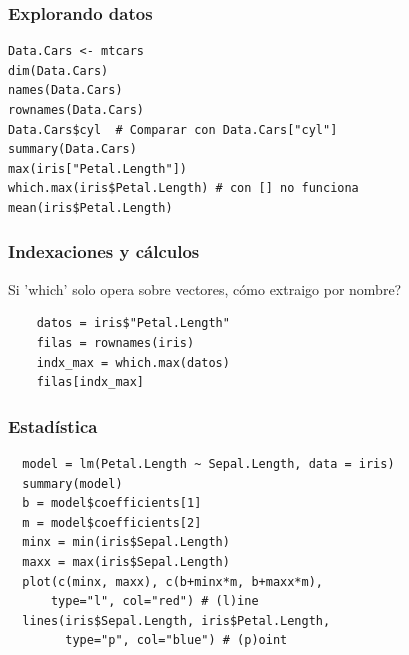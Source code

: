 \documentclass[14pt,aspectratio=169,xcolor=dvipsnames]{beamer}
\begin{document}
\begin{frame}[fragile]\frametitle{Explorando datos}
    \begin{verbatim}
Data.Cars <- mtcars 
dim(Data.Cars)
names(Data.Cars) 
rownames(Data.Cars)
Data.Cars$cyl  # Comparar con Data.Cars["cyl"]
summary(Data.Cars)
max(iris["Petal.Length"]) 
which.max(iris$Petal.Length) # con [] no funciona
mean(iris$Petal.Length)
    \end{verbatim}
\end{frame}
\begin{frame}[fragile]\frametitle{Indexaciones y cálculos}
Si 'which' solo opera sobre vectores, cómo extraigo por nombre? \pause

    \begin{verbatim}  
    datos = iris$"Petal.Length"
    filas = rownames(iris)
    indx_max = which.max(datos)
    filas[indx_max]
    \end{verbatim}
\end{frame}
\begin{frame}[fragile]\frametitle{Estadística}
    \begin{small}
\begin{verbatim}
  model = lm(Petal.Length ~ Sepal.Length, data = iris)
  summary(model)
  b = model$coefficients[1]
  m = model$coefficients[2]
  minx = min(iris$Sepal.Length)
  maxx = max(iris$Sepal.Length)
  plot(c(minx, maxx), c(b+minx*m, b+maxx*m), 
      type="l", col="red") # (l)ine
  lines(iris$Sepal.Length, iris$Petal.Length, 
        type="p", col="blue") # (p)oint
\end{verbatim}
    \end{small}
\end{frame}

\end{document}
